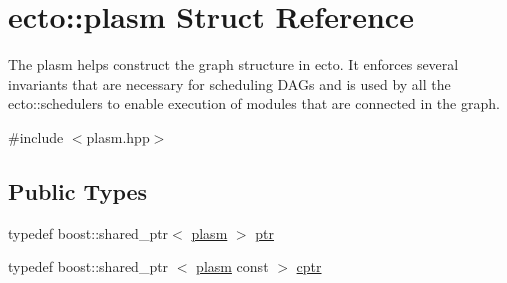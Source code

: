 \hypertarget{structecto_1_1plasm}{\section{ecto\-:\-:plasm \-Struct \-Reference}
\label{structecto_1_1plasm}
}


\-The plasm helps construct the graph structure in ecto. \-It enforces several invariants that are necessary for scheduling \-D\-A\-Gs and is used by all the ecto\-::schedulers to enable execution of modules that are connected in the graph.  




{\ttfamily \#include $<$plasm.\-hpp$>$}

\subsection*{\-Public \-Types}
\begin{DoxyCompactItemize}
\item 
typedef boost\-::shared\-\_\-ptr$<$ \hyperlink{structecto_1_1plasm}{plasm} $>$ \hyperlink{structecto_1_1plasm_a899b9da452ab35849f07038c90990ac3}{ptr}
\item 
typedef boost\-::shared\-\_\-ptr\*
$<$ \hyperlink{structecto_1_1plasm}{plasm} const  $>$ \hyperlink{structecto_1_1plasm_afd3b9e2d4732023ab9e94553e0d66ac4}{cptr}
\end{DoxyCompactItemize}
